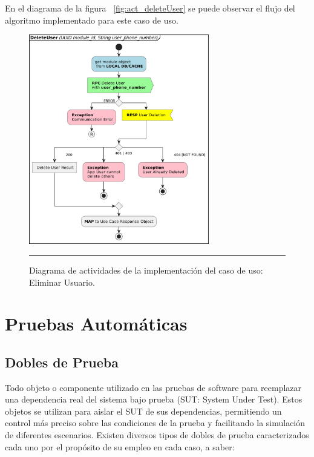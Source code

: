 En el diagrama de la figura ~\ref{fig:act_deleteUser} se puede observar el flujo del algoritmo implementado para este caso de uso.

\begin{figure}[htbp]
	\centering
	\includegraphics[width=0.7\textwidth]{Figures/iter2/ACT_deleteUser.png}
	\rule{35em}{1pt}
	\caption[Class Diagram]{Diagrama de actividades de la implementación del caso de uso: Eliminar Usuario.}
	\label{fig:act_act_deleteUser}
\end{figure}

\section{Pruebas Automáticas}

\subsection{Dobles de Prueba}
Todo objeto o componente utilizado en las pruebas de software para reemplazar una dependencia real del sistema bajo prueba (SUT: System Under Test). Estos objetos se utilizan para aislar el SUT de sus dependencias, permitiendo un control más preciso sobre las condiciones de la prueba y facilitando la simulación de diferentes escenarios.
Existen diversos tipos de dobles de prueba caracterizados cada uno por el propósito de su empleo en cada caso, a saber:

